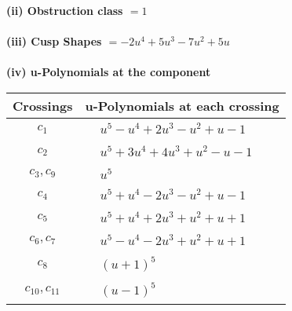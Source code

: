 \documentclass[1p]{elsarticle_modified}
\theoremstyle{definition}
\begin{document}
\flushleft \textbf{(ii) Obstruction class $= 1$}\\~\\
\flushleft \textbf{(iii) Cusp Shapes $= -2 u^4+5 u^3-7 u^2+5 u$}\\~\\
\newpage\renewcommand{\arraystretch}{1}
\flushleft \textbf{(iv) u-Polynomials at the component}\newline \\
\begin{tabular}{m{50pt}|m{274pt}}
Crossings & \hspace{64pt}u-Polynomials at each crossing \\
\hline $$\begin{aligned}c_{1}\end{aligned}$$&$\begin{aligned}
&u^5- u^4+2 u^3- u^2+u-1
\end{aligned}$\\
\hline $$\begin{aligned}c_{2}\end{aligned}$$&$\begin{aligned}
&u^5+3 u^4+4 u^3+u^2- u-1
\end{aligned}$\\
\hline $$\begin{aligned}c_{3},c_{9}\end{aligned}$$&$\begin{aligned}
&u^5
\end{aligned}$\\
\hline $$\begin{aligned}c_{4}\end{aligned}$$&$\begin{aligned}
&u^5+u^4-2 u^3- u^2+u-1
\end{aligned}$\\
\hline $$\begin{aligned}c_{5}\end{aligned}$$&$\begin{aligned}
&u^5+u^4+2 u^3+u^2+u+1
\end{aligned}$\\
\hline $$\begin{aligned}c_{6},c_{7}\end{aligned}$$&$\begin{aligned}
&u^5- u^4-2 u^3+u^2+u+1
\end{aligned}$\\
\hline $$\begin{aligned}c_{8}\end{aligned}$$&$\begin{aligned}
&(u+1)^5
\end{aligned}$\\
\hline $$\begin{aligned}c_{10},c_{11}\end{aligned}$$&$\begin{aligned}
&(u-1)^5
\end{aligned}$\\
\hline
\end{tabular}\\~\\
\end{document}
